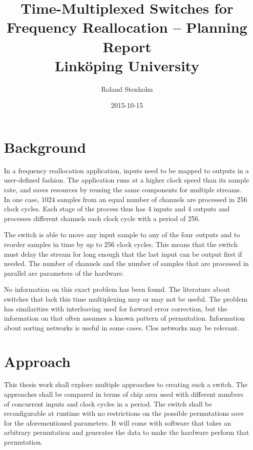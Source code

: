 \documentclass[12pt]{report}
\begin{document}
\title {
	{Time-Multiplexed Switches for Frequency Reallocation
		-- Planning Report}\\
	{\large Linköping University}
}

\author{Roland Stenholm}
\date{2015-10-15}

\maketitle

\section{Background}

In a frequency reallocation application, inputs need to be mapped to outputs in
a user-defined fashion. The application runs at a higher clock speed than its
sample rate, and saves resources by reusing the same components for multiple
streams. In one case, 1024 samples from an equal number of channels are
processed in 256 clock cycles. Each stage of the process thus has 4 inputs and
4 outputs and processes different channels each clock cycle with a period of
256.

The switch is able to move any input sample to any of the four outputs and to
reorder samples in time by up to 256 clock cycles. This means that the switch
must delay the stream for long enough that the last input can be output first
if needed. The number of channels and the number of samples that are processed
in parallel are parameters of the hardware.

No information on this exact problem has been found. The literature about
switches that lack this time multiplexing may or may not be useful. The problem
has similarities with interleaving used for forward error correction, but the
information on that often assumes a known pattern of permutation. Information
about sorting networks is useful in some cases. Clos networks may be relevant.

\section{Approach}

This thesis work shall explore multiple approaches to creating such a switch.
The approaches shall be compared in terms of chip area used with different
numbers of concurrent inputs and clock cycles in a period. The switch shall
be reconfigurable at runtime with no restrictions on the possible permutations
save for the aforementioned parameters. It will come with software that takes
an arbitrary permutation and generates the data to make the hardware perform
that permutation.
\end{document}
